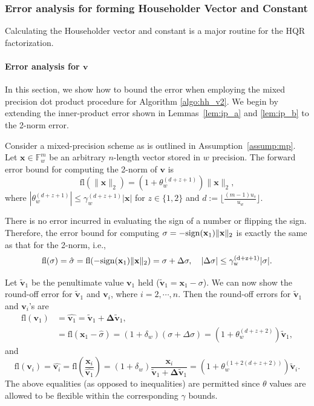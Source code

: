 \documentclass[review,onefignum,onetabnum]{siamart190516}
\newcommand{\F}{\mathbb{F}}
\newcommand{\dd}{\delta}
\newcommand{\tth}{\theta}
\newcommand{\bb}[1]{\mathbf{#1}}
\newcommand{\fl}{\mathrm{fl}}
\begin{document}
\subsubsection{Error analysis for forming Householder Vector and Constant}
Calculating the Householder vector and constant is a major routine for the HQR factorization. 

\paragraph{Error analysis for $\bb{v}$}
In this section, we show how to bound the error when employing the mixed precision dot product procedure for Algorithm \ref{algo:hh_v2}.
We begin by extending the inner-product error shown in Lemmas~\ref{lem:ip_a} and \ref{lem:ip_b} to the 2-norm error. 
\par

\begin{lemma}
	\label{lem:2norm_a}
	Consider a mixed-precision scheme as is outlined in Assumption~\ref{assump:mp}.
	Let $\bb{x}\in \F_w^{m}$ be an arbitrary $n$-length vector stored in $w$ precision.
	The forward error bound for computing the 2-norm of $\bb{v}$ is
	\begin{equation}
	\fl(\|\bb{x}\|_2)= (1+\tth_w^{(d+z+1)})\|\bb{x}\|_2,
	\end{equation}
	where $|\tth_w^{(d+z+1)}|\leq \gamma_w^{(d+z+1)}|\bb{x}|$ for $z\in\{1,2\}$ and $d:=\lfloor\frac{(m-1)u_s}{u_w}\rfloor$.
\end{lemma} 
There is no error incurred in evaluating the sign of a number or flipping the sign. 
Therefore, the error bound for computing $\sigma = -\rm{sign}(\bb{x}_1)\|\bb{x}\|_2$ is exactly the same as that for the 2-norm, i.e.,
\begin{equation}
\label{eqn:sigma}
\fl(\sigma) = \hat{\sigma} = \rm{fl}(-\rm{sign}(\bb{x}_1)\|\bb{x}\|_2) = \sigma + \Delta \sigma,\quad |\Delta\sigma| \leq \gamma_w^{(d+z+1)}|\sigma|.
\end{equation}

Let $\bb{\tilde{v}}_1$ be the penultimate value $\bb{v}_1$ held ($\bb{\tilde{v}}_1 = \bb{x}_1-\sigma$).
We can now show the round-off error for $\bb{\tilde{v}}_1$ and $\bb{v}_i$, where $i=2 , \cdots, n$. 
Then the round-off errors for $\bb{\tilde{v}}_1$ and $\bb{v}_i$'s are
\begin{align*}
\fl(\bb{v}_1)&=\hat{\bb{v}_1} = \bb{\tilde{v}}_1 + \bb{\Delta \tilde{v}}_1, \\
&= \fl(\bb{x}_1-\hat{\sigma})= (1+\dd_w) (\sigma + \Delta\sigma) = (1+\tth_w^{(d+z+2)})\bb{\tilde{v}}_1,
\end{align*}
and
\begin{equation*}
\fl(\bb{v}_i)=\hat{\bb{v}_i} = \fl\left(\frac{\bb{x}_i}{\hat{\bb{v}_1}}\right) = (1+\dd_w)\frac{\bb{x}_i}{\bb{\tilde{v}}_1 + \bb{\Delta \tilde{v}}_1}=(1+\theta_w^{(1+2(d+z+2))})\bb{\tilde{v}}_i.
\end{equation*}
The above equalities (as opposed to inequalities) are permitted since $\tth$ values are allowed to be flexible within the corresponding $\gamma$ bounds.%
\end{document}
